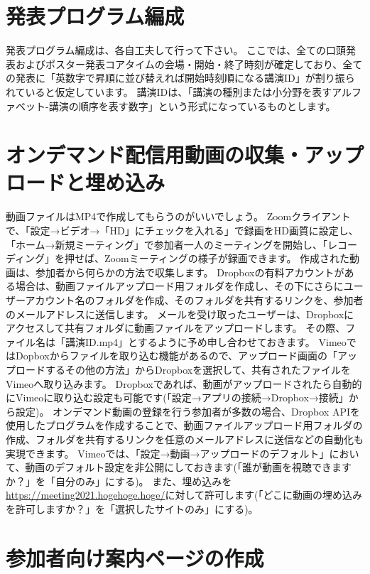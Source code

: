 \documentclass[titlepage,10pt,a4paper,uplatex]{jsbook}
\begin{document}
\section{発表プログラム編成}

発表プログラム編成は、各自工夫して行って下さい。
ここでは、全ての口頭発表およびポスター発表コアタイムの会場・開始・終了時刻が確定しており、全ての発表に「英数字で昇順に並び替えれば開始時刻順になる講演ID」が割り振られていると仮定しています。
講演IDは、「講演の種別または小分野を表すアルファベット-講演の順序を表す数字」という形式になっているものとします。

\section{オンデマンド配信用動画の収集・アップロードと埋め込み}

動画ファイルはMP4で作成してもらうのがいいでしょう。
Zoomクライアントで、「設定→ビデオ→「HD」にチェックを入れる」で録画をHD画質に設定し、「ホーム→新規ミーティング」で参加者一人のミーティングを開始し、「レコーディング」を押せば、Zoomミーティングの様子が録画できます。
作成された動画は、参加者から何らかの方法で収集します。
Dropboxの有料アカウントがある場合は、動画ファイルアップロード用フォルダを作成し、その下にさらにユーザーアカウント名のフォルダを作成、そのフォルダを共有するリンクを、参加者のメールアドレスに送信します。
メールを受け取ったユーザーは、Dropboxにアクセスして共有フォルダに動画ファイルをアップロードします。
その際、ファイル名は「講演ID.mp4」とするように予め申し合わせておきます。
VimeoではDopboxからファイルを取り込む機能があるので、アップロード画面の「アップロードするその他の方法」からDropboxを選択して、共有されたファイルをVimeoへ取り込みます。
Dropboxであれば、動画がアップロードされたら自動的にVimeoに取り込む設定も可能です(「設定→アプリの接続→Dropbox→接続」から設定)。
オンデマンド動画の登録を行う参加者が多数の場合、Dropbox APIを使用したプログラムを作成することで、動画ファイルアップロード用フォルダの作成、フォルダを共有するリンクを任意のメールアドレスに送信などの自動化も実現できます。
Vimeoでは、「設定→動画→アップロードのデフォルト」において、動画のデフォルト設定を非公開にしておきます(「誰が動画を視聴できますか？」を「自分のみ」にする)。
また、埋め込みを\url{https://meeting2021.hogehoge.hoge/}に対して許可します(「どこに動画の埋め込みを許可しますか？」を「選択したサイトのみ」にする)。

\section{参加者向け案内ページの作成}
\end{document}
